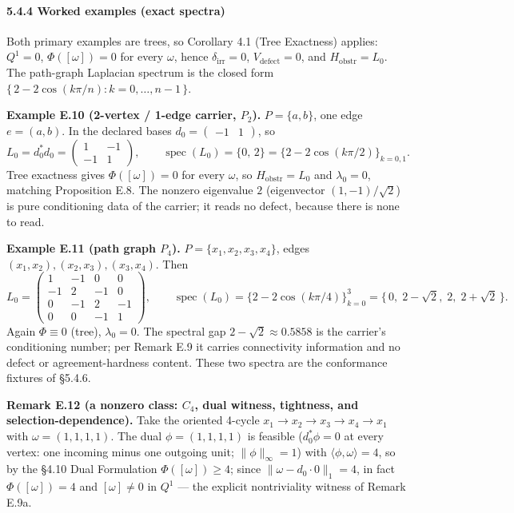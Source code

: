 \documentclass[
]{article}
\begin{document}
\paragraph{5.4.4 Worked examples (exact spectra)}\label{worked-examples-exact-spectra}

Both primary examples are trees, so Corollary 4.1 (Tree Exactness) applies: \(Q^1 = 0\), \(\Phi([\omega]) = 0\) for every \(\omega\), hence \(\delta_{\mathrm{irr}} = 0\), \(V_{\mathrm{defect}} = 0\), and \(H_{\mathrm{obstr}} = L_0\). The path-graph Laplacian spectrum is the closed form \(\{\,2 - 2\cos(k\pi/n) : k = 0, \dots, n-1\,\}\).

\textbf{Example E.10 (2-vertex / 1-edge carrier, \(P_2\)).} \(P = \{a, b\}\), one edge \(e = (a,b)\). In the declared bases \(d_0 = \begin{pmatrix} -1 & 1 \end{pmatrix}\), so
\[L_0 = d_0^* d_0 = \begin{pmatrix} 1 & -1 \\ -1 & 1 \end{pmatrix}, \qquad \operatorname{spec}(L_0) = \{0,\, 2\} = \{2 - 2\cos(k\pi/2)\}_{k=0,1}.\]
Tree exactness gives \(\Phi([\omega]) = 0\) for every \(\omega\), so \(H_{\mathrm{obstr}} = L_0\) and \(\lambda_0 = 0\), matching Proposition E.8. The nonzero eigenvalue \(2\) (eigenvector \((1,-1)/\sqrt{2}\)) is pure conditioning data of the carrier; it reads no defect, because there is none to read.

\textbf{Example E.11 (path graph \(P_4\)).} \(P = \{x_1, x_2, x_3, x_4\}\), edges \((x_1,x_2), (x_2,x_3), (x_3,x_4)\). Then
\[L_0 = \begin{pmatrix} 1 & -1 & 0 & 0 \\ -1 & 2 & -1 & 0 \\ 0 & -1 & 2 & -1 \\ 0 & 0 & -1 & 1 \end{pmatrix}, \qquad \operatorname{spec}(L_0) = \{2 - 2\cos(k\pi/4)\}_{k=0}^{3} = \{\,0,\; 2 - \sqrt{2},\; 2,\; 2 + \sqrt{2}\,\}.\]
Again \(\Phi \equiv 0\) (tree), \(\lambda_0 = 0\). The spectral gap \(2 - \sqrt{2} \approx 0.5858\) is the carrier's conditioning number; per Remark E.9 it carries connectivity information and no defect or agreement-hardness content. These two spectra are the conformance fixtures of §5.4.6.

\textbf{Remark E.12 (a nonzero class: \(C_4\), dual witness, tightness, and selection-dependence).} Take the oriented 4-cycle \(x_1 \to x_2 \to x_3 \to x_4 \to x_1\) with \(\omega = (1,1,1,1)\). The dual \(\phi = (1,1,1,1)\) is feasible (\(d_0^*\phi = 0\) at every vertex: one incoming minus one outgoing unit; \(\|\phi\|_\infty = 1\)) with \(\langle \phi, \omega \rangle = 4\), so by the §4.10 Dual Formulation \(\Phi([\omega]) \ge 4\); since \(\|\omega - d_0 \cdot 0\|_1 = 4\), in fact \(\Phi([\omega]) = 4\) and \([\omega] \neq 0\) in \(Q^1\) --- the explicit nontriviality witness of Remark E.9a.
\end{document}
